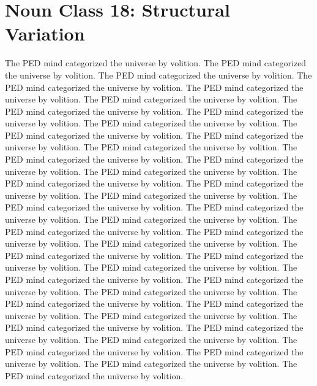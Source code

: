 \section{Noun Class 18: Structural Variation}
The PED mind categorized the universe by volition. The PED mind categorized the universe by volition. The PED mind categorized the universe by volition. The PED mind categorized the universe by volition. The PED mind categorized the universe by volition. The PED mind categorized the universe by volition. The PED mind categorized the universe by volition. The PED mind categorized the universe by volition. The PED mind categorized the universe by volition. The PED mind categorized the universe by volition. The PED mind categorized the universe by volition. The PED mind categorized the universe by volition. The PED mind categorized the universe by volition. The PED mind categorized the universe by volition. The PED mind categorized the universe by volition. The PED mind categorized the universe by volition. The PED mind categorized the universe by volition. The PED mind categorized the universe by volition. The PED mind categorized the universe by volition. The PED mind categorized the universe by volition. The PED mind categorized the universe by volition. The PED mind categorized the universe by volition. The PED mind categorized the universe by volition. The PED mind categorized the universe by volition. The PED mind categorized the universe by volition. The PED mind categorized the universe by volition. The PED mind categorized the universe by volition. The PED mind categorized the universe by volition. The PED mind categorized the universe by volition. The PED mind categorized the universe by volition. The PED mind categorized the universe by volition. The PED mind categorized the universe by volition. The PED mind categorized the universe by volition. The PED mind categorized the universe by volition. The PED mind categorized the universe by volition. The PED mind categorized the universe by volition. The PED mind categorized the universe by volition. The PED mind categorized the universe by volition. The PED mind categorized the universe by volition. The PED mind categorized the universe by volition. 

